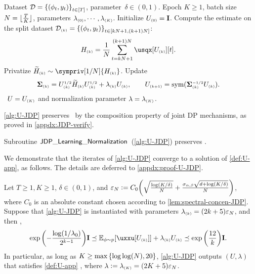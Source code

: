 \newcommand{\dataset}{\cD}
\newcommand{\errpara}{parameter}
\begin{algorithm}
\caption{Subroutine $\JDPLU$ %
}\label{alg:U-JDP}
\begin{algorithmic}
\REQUIRE Dataset $\mathcal{D}=\left\{(\phi_t,y_t)\right\}_{t\in[T]}$, \errpara~$\delta\in(0,1)$.
\REQUIRE Epoch $K\geq 1$, batch size $N=\lfloor\frac{T}{K}\rfloor$, parameters $\lambda_{\scriptscriptstyle{ (0) }},\cdots,\lambda_{\scriptscriptstyle{ (K) }}$. %
\STATE Initialize $U_{\scriptscriptstyle{ (0) }}=\mathbf{I}$.
    \STATE Compute the estimate on the split dataset $\dataset\kk=\sset{(\x_t,y_t)}_{t\in[kN+1,(k+1)N]}$:
    \begin{align}\label{eq:spectral-approx-JDP}
        H\kk=\frac1N\sumkn \usqx[U\kk][t].
    \end{align}
    \STATE Privatize $\til H\kk\sim \sympriv[1/N]{ H\kk }$.
    \STATE Update
    \begin{align*}
        \boldsymbol{\Sigma}_{\scriptscriptstyle{ (k) }}=U_{\scriptscriptstyle{ (k) }}^{{\scriptscriptstyle1/2}} \widetilde H_{\scriptscriptstyle{ (k) }} U_{\scriptscriptstyle{ (k) }}^{{\scriptscriptstyle1/2}}+\lambda_{\scriptscriptstyle{ (k) }} U_{\scriptscriptstyle{ (k) }}, \qquad
        U_{\scriptscriptstyle{ (k+1) }}=\mathrm{sym}(\boldsymbol{\Sigma}_{\scriptscriptstyle{ (k) }}^{{\scriptscriptstyle-1/2}} U_{\scriptscriptstyle{ (k) }}).
    \end{align*}
\ENDFOR
\ENSURE \Um~$U=U_{\scriptscriptstyle{ (K) }}$ and normalization parameter $\lambda=\lambda_{\scriptscriptstyle{ (K) }}$.
\end{algorithmic}
\end{algorithm}





\cref{alg:U-JDP} preserves \aJDP~by the composition property of joint DP mechanisms, as proved in \cref{appdx:JDP-verify}. 
\begin{lemma}\label{lem:U-JDP-preserve}
    Subroutine $\JDPLU$~(\cref{alg:U-JDP}) preserves \aJDP.
\end{lemma}
We demonstrate that the iterates of \cref{alg:U-JDP} converge to a solution of \eqref{def:U-app}, as follows. The details are deferred to \cref{appdx:proof-U-JDP}.

\begin{proposition}\label{prop:alg-U-JDP}
Let $T\geq 1, K\geq 1$, $\delta\in(0,1)$, and $\varepsilon_N\mathrel{\mathop:}= C_0{\left(  \sqrt{\frac{\log(K/\delta)}{N}}+\frac{\sigma_{\alpha,\beta}\sqrt{d+\log(K/\delta)}}{N}  \right)}$, where $C_0$ is an absolute constant chosen according to \cref{lem:spectral-concen-JDP}. Suppose that \cref{alg:U-JDP} is instantiated with parameters $\lambda_{\scriptscriptstyle{ (k) }}=(2k+5)\varepsilon_N$, and then \whp,
\begin{align*}
    \exp\paren{ -\frac{\log(1/\lambda_0)}{2^{k-1}} }\id \preceq \Ep{ \uxxu[U\kk] }+\lambda\kk U\kk \preceq \exp\paren{ \frac{12}{k} }\id.
\end{align*}
In particular, as long as $K\geq \max\left\{\log\log(N),20\right\}$, \cref{alg:U-JDP} outputs $(U,\lambda)$ that satisfies \eqref{def:U-app} \whp, where $\lambda\mathrel{\mathop:}= \lambda_{\scriptscriptstyle{ (K) }}=(2K+5)\varepsilon_N$.
\end{proposition}




